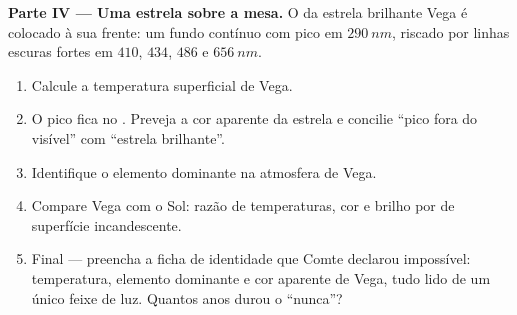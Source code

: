 \begin{problem}
\medskip
\noindent\textbf{Parte IV --- Uma estrela sobre a mesa.}
O  da estrela brilhante Vega é colocado à sua frente: um fundo
contínuo com pico em $\qty{290}{nm}$, riscado por linhas escuras fortes em
$410$, $434$, $486$ e $\qty{656}{nm}$.
\begin{enumerate}[resume]
  \item Calcule a temperatura superficial de Vega.
  \item O pico fica no . Preveja a cor aparente da estrela e
        concilie ``pico fora do visível'' com ``estrela brilhante''.
  \item Identifique o elemento dominante na atmosfera de Vega.
  \item Compare Vega com o Sol: razão de temperaturas, cor e brilho por
         de superfície incandescente.
  \item Final --- preencha a ficha de identidade que Comte declarou
        impossível: temperatura, elemento dominante e cor aparente de Vega,
        tudo lido de um único feixe de luz. Quantos anos durou o ``nunca''?
\end{enumerate}
\end{problem}
